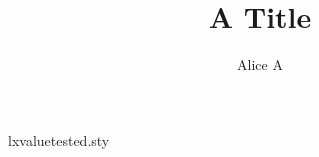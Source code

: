 \begin{filecontents*}[overwrite]{lxvaluetested.sty}
\def\@maketitle{\begin{center}{\Large\@title\par}\ifnum\c@page>5 \@author\par\fi\end{center}}
\end{filecontents*}
\documentclass{lxnosuchclassvt}
\usepackage{lxvaluetested}
\title{A Title}
\author{Alice A}
\makeatletter\g@addto@macro{}\makeatother

\maketitle
Body.

